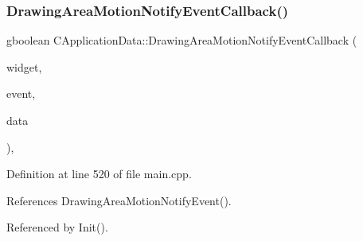 \subsubsection{\texorpdfstring{Drawing\+Area\+Motion\+Notify\+Event\+Callback()}{DrawingAreaMotionNotifyEventCallback()}}
{\footnotesize\ttfamily gboolean C\+Application\+Data\+::\+Drawing\+Area\+Motion\+Notify\+Event\+Callback (\begin{DoxyParamCaption}\item[{Gtk\+Widget $\ast$}]{widget,  }\item[{Gdk\+Event\+Motion $\ast$}]{event,  }\item[{gpointer}]{data }\end{DoxyParamCaption})\hspace{0.3cm}{\ttfamily [static]}, {\ttfamily [protected]}}



Definition at line 520 of file main.\+cpp.



References Drawing\+Area\+Motion\+Notify\+Event().



Referenced by Init().


